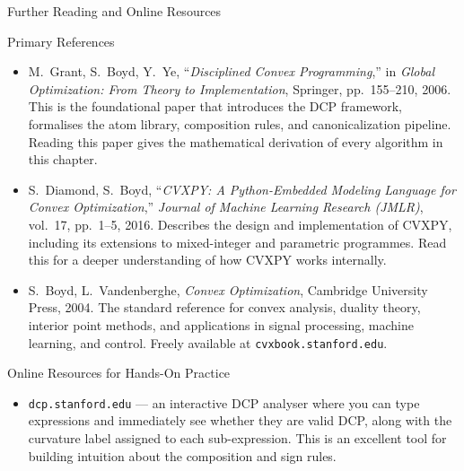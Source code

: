 \documentclass[aspectratio=169,10pt]{beamer}
\begin{document}
\begin{frame}[allowframebreaks]{Further Reading and Online Resources}

  \begin{block}{Primary References}
    \begin{itemize}
      \item M.\ Grant, S.\ Boyd, Y.\ Ye,
            ``\textit{Disciplined Convex Programming},''
            in \textit{Global Optimization: From Theory to
            Implementation}, Springer, pp.\ 155--210, 2006.
            This is the foundational paper that introduces the DCP
            framework, formalises the atom library, composition rules,
            and canonicalization pipeline.  Reading this paper gives
            the mathematical derivation of every algorithm in this
            chapter.

      \item S.\ Diamond, S.\ Boyd,
            ``\textit{CVXPY: A Python-Embedded Modeling Language for
            Convex Optimization},''
            \textit{Journal of Machine Learning Research (JMLR)},
            vol.\ 17, pp.\ 1--5, 2016.
            Describes the design and implementation of CVXPY, including
            its extensions to mixed-integer and parametric programmes.
            Read this for a deeper understanding of how CVXPY works
            internally.

      \item S.\ Boyd, L.\ Vandenberghe,
            \textit{Convex Optimization}, Cambridge University Press,
            2004.  The standard reference for convex analysis, duality
            theory, interior point methods, and applications in signal
            processing, machine learning, and control.  Freely
            available at \texttt{cvxbook.stanford.edu}.
    \end{itemize}
  \end{block}

  \begin{block}{Online Resources for Hands-On Practice}
    \begin{itemize}
      \item \texttt{dcp.stanford.edu} --- an interactive DCP analyser
            where you can type expressions and immediately see whether
            they are valid DCP, along with the curvature label assigned
            to each sub-expression.  This is an excellent tool for
            building intuition about the composition and sign rules.


\end{itemize}
\end{block}
\end{frame}
\end{document}
